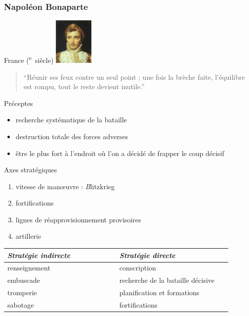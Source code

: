 \documentclass{article}
\newcommand{\cRM}[1]{\MakeUppercase{\romannumeral #1}}  %
\newcommand{\siecle}[1]{\cRM{#1}\textsuperscript{e}~siècle}
\begin{document}
\subsubsection{Napoléon Bonaparte}
France (\siecle{18})
\includegraphics[trim=0cm 2cm 0cm 0cm, clip=true, width=1.9cm]{../ressources/napoleon}
\begin{quote}“Réunir ses feux contre un seul point ; une fois la brèche faite, l’équilibre est rompu, tout le reste devient inutile.”\end{quote}
Préceptes
\begin{itemize}
\item recherche systématique de la bataille
\item destruction totale des forces adverses
\item être le plus fort à l’endroit où l’on a décidé de frapper le coup décisif
\end{itemize}
Axes stratégiques
\begin{enumerate}
\item vitesse de manœuvre : {\emph Blitzkrieg}
\item fortifications
\item lignes de réapprovisionnement provisoires
\item artillerie
\end{enumerate}
\cite{napoleon, napoleon_wiki, napoleon_portrait}


\begin{tabular}{|p{0.45\linewidth}|p{0.45\linewidth}|}
\hline
\emph{Stratégie indirecte} & \emph{Stratégie directe}\\
\hline
renseignement & conscription\\
embuscade & recherche de la bataille décisive\\
tromperie & planification et formations\\
sabotage & fortifications\\
\hline
\end{tabular}
\end{document}
